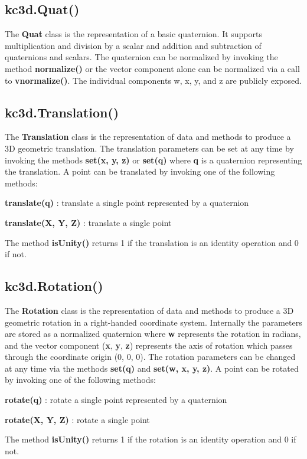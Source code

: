 \documentclass[a4paper, dvipdfm]{article}
\begin{document}
\subsection{kc3d.Quat()}
The \textbf{Quat} class is the representation of a basic quaternion. It supports
multiplication and division by a scalar and addition and subtraction of quaternions
and scalars. The quaternion can be normalized by invoking the method \textbf{normalize()}
or the vector component alone can be normalized via a call to \textbf{vnormalize()}.
The individual components w, x, y, and z are publicly exposed.

\subsection{kc3d.Translation()}
The \textbf{Translation} class is the representation of data and methods to
produce a 3D geometric translation. The translation parameters can be set at any
time by invoking the methods \textbf{set(x, y, z)} or \textbf{set(q)} where \textbf{q}
is a quaternion representing the translation. A point can be
translated by invoking one of the following methods:

\textbf{translate(q)} : translate a single point represented by a quaternion

\textbf{translate(X, Y, Z)} : translate a single point

The method \textbf{isUnity()} returns 1 if the translation is an identity operation and
0 if not.

\subsection{kc3d.Rotation()}
The \textbf{Rotation} class is the representation of data and methods to produce
a 3D geometric rotation in a right-handed coordinate system. Internally the
parameters are stored as a normalized quaternion where \textbf{w} represents the
rotation in radians, and the vector component (\textbf{x}, \textbf{y}, \textbf{z})
represents the axis of rotation which passes through the coordinate origin (0, 0, 0).
The rotation parameters can be changed at any time via the methods \textbf{set(q)}
and \textbf{set(w, x, y, z)}. A point can be rotated by invoking one
of the following methods:

\textbf{rotate(q)} : rotate a single point represented by a quaternion

\textbf{rotate(X, Y, Z)} : rotate a single point

The method \textbf{isUnity()} returns 1 if the rotation is an identity operation and
0 if not.
\end{document}
